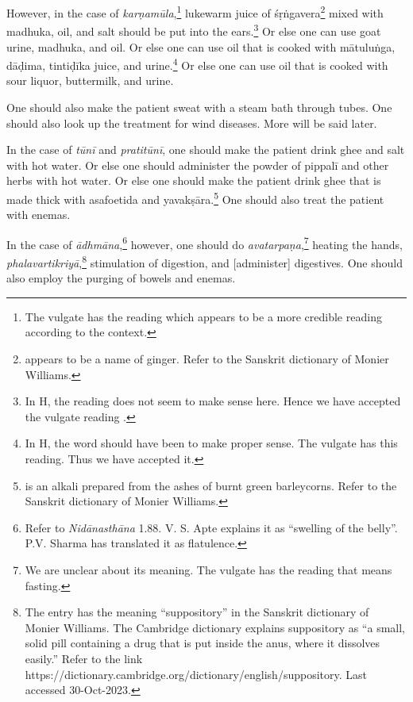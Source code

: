 \begin{translation}
\begin{tt}
        However, in the case of
        \textit{karṇamūla},\footnote{The vulgate has the reading 
            which appears to be a more credible reading according to the context.}
        lukewarm juice of \gls{śṛṅgavera}\footnote{ appears to be a
            name of ginger. Refer to the Sanskrit dictionary of Monier Williams.} mixed with
        \gls{madhuka}, oil, and salt should be put into the ears.\footnote{In H, the
            reading  does not seem to make sense here. Hence we have
            accepted the vulgate reading .} Or else one can use goat urine,
        \gls{madhuka}, and oil. Or else one can use oil that is cooked with
        \gls{mātuluṅga}, \gls{dāḍima}, \gls{tintiḍīka} juice, and urine.\footnote{In H,
            the word  should have been  to make proper sense. The
            vulgate has this reading. Thus we have accepted it.} Or else one can use oil
        that is cooked with sour liquor, buttermilk, and urine.



        One should also make the
        patient sweat with a steam bath through tubes. One should also look up the
        treatment for wind diseases. More will be said later.



        \item[25]

        In the case of \textit{tūnī}
        and \textit{pratitūnī}, one should make the patient drink ghee and salt with hot
        water. Or else one should administer the powder of \gls{pippalī} and other
        herbs with hot water. Or else one should make the patient drink ghee that is
        made thick with asafoetida and \gls{yavakṣāra}.\footnote{ is
            an alkali prepared from the ashes of burnt green barleycorns. Refer to the
            Sanskrit dictionary of Monier Williams.} One should also treat the patient with
        enemas.



        \item[26]

        In the case of
        \textit{ādhmāna},\footnote{Refer to \textit{Nidānasthāna} 1.88. V. S. Apte
            explains it as \enquote{swelling of the belly}. P.V. Sharma has translated it as
            flatulence.} however, one should do \textit{avatarpaṇa},\footnote{We are
            unclear about its meaning. The vulgate has the reading  that
            means fasting.} heating the hands, \textit{phalavartikriyā},\footnote{The entry
             has the meaning \enquote{suppository} in the Sanskrit
            dictionary of Monier Williams. The Cambridge dictionary explains suppository as
            \enquote{a small, solid pill containing a drug that is put inside the anus, where
                it dissolves easily.} Refer to the link
            https://dictionary.cambridge.org/dictionary/english/suppository. Last accessed
            30-Oct-2023.} stimulation of digestion, and [administer] digestives. One should
        also employ the purging of bowels and enemas.




\end{tt}
\end{translation}
